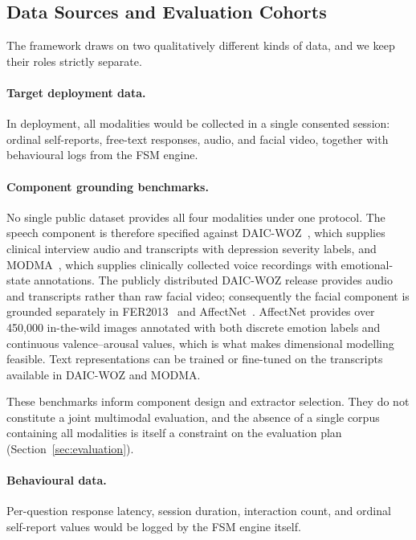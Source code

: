 \documentclass[12pt]{article}
\begin{document}
\subsection{Data Sources and Evaluation Cohorts}
\label{sec:data}

The framework draws on two qualitatively different kinds of data, and we
keep their roles strictly separate.

\paragraph{Target deployment data.} In deployment, all modalities would
be collected in a single consented session: ordinal self-reports,
free-text responses, audio, and facial video, together with behavioural
logs from the FSM engine.

\paragraph{Component grounding benchmarks.} No single public dataset
provides all four modalities under one protocol. The speech component is
therefore specified against DAIC-WOZ~\cite{gratch2014daic}, which
supplies clinical interview audio and transcripts with depression
severity labels, and MODMA~\cite{liu2022modma}, which supplies
clinically collected voice recordings with emotional-state annotations.
The publicly distributed DAIC-WOZ release provides audio and transcripts
rather than raw facial video; consequently the facial component is
grounded separately in FER2013~\cite{goodfellow2013fer} and
AffectNet~\cite{mollahosseini2017affectnet}. AffectNet provides over
450{,}000 in-the-wild images annotated with both discrete emotion labels
and continuous valence--arousal values, which is what makes dimensional
modelling feasible. Text representations can be trained or fine-tuned on
the transcripts available in DAIC-WOZ and MODMA.

These benchmarks inform component design and extractor selection. They
do not constitute a joint multimodal evaluation, and the absence of a
single corpus containing all modalities is itself a constraint on the
evaluation plan (Section~\ref{sec:evaluation}).

\paragraph{Behavioural data.} Per-question response latency, session
duration, interaction count, and ordinal self-report values would be
logged by the FSM engine itself.
\end{document}
